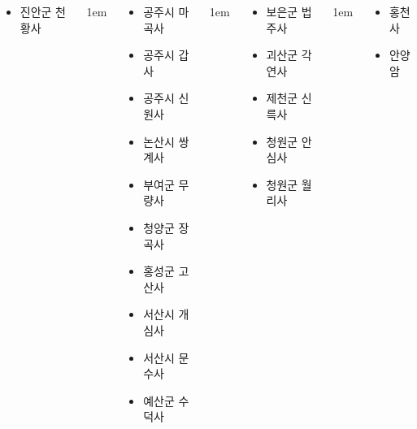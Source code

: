 \documentclass[	20pt, 
							a0paper, 
							landscape,
							margin=0mm, %
							innermargin=10mm,  		%
							blockverticalspace=4mm, %
							colspace=5mm, 
							subcolspace=0mm
							]{tikzposter}
\begin{document}
\begin{columns}
{\begin{LARGE}
\begin{itemize}
					\item 진안군 	천황사
					\end{itemize}
				\end{LARGE}
			} %



			{
					\setlength{\leftmargini}{4em}
					\setlength{\labelsep} {1em}
				\begin{LARGE}
					\begin{itemize}
					\item 공주시 	마곡사
					\item 공주시 	갑사
					\item 공주시 	신원사

					\item 논산시 	쌍계사
					\item 부여군		무량사
					\item 청양군		장곡사
					\item 홍성군		고산사
					\item 서산시		개심사
					\item 서산시		문수사
					\item 예산군 	수덕사
					\end{itemize}
				\end{LARGE}
			} %



			{
					\setlength{\leftmargini}{4em}
					\setlength{\labelsep} {1em}
				\begin{LARGE}
					\begin{itemize}
					\item 보은군		법주사
					\item 괴산군		각연사
					\item 제천군		신륵사
					\item 청원군		안심사
					\item 청원군		월리사
					\end{itemize}
				\end{LARGE}
			} %


			{
					\setlength{\leftmargini}{4em}
					\setlength{\labelsep} {1em}
				\begin{LARGE}
					\begin{itemize}
					\item 홍천사
					\item 안양암
					\end{itemize}
				\end{LARGE}
			} %





	\end{columns}
\end{document}
